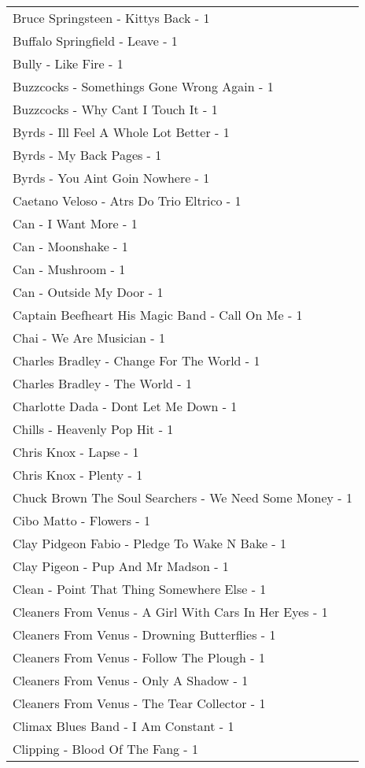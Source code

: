 \documentclass[
]{article}
\begin{document}
\begin{longtable}{l}
Bruce Springsteen - Kittys Back - 1 \\ 
Buffalo Springfield - Leave - 1 \\ 
Bully - Like Fire - 1 \\ 
Buzzcocks - Somethings Gone Wrong Again - 1 \\ 
Buzzcocks - Why Cant I Touch It - 1 \\ 
Byrds - Ill Feel A Whole Lot Better - 1 \\ 
Byrds - My Back Pages - 1 \\ 
Byrds - You Aint Goin Nowhere - 1 \\ 
Caetano Veloso - Atrs Do Trio Eltrico - 1 \\ 
Can - I Want More - 1 \\ 
Can - Moonshake - 1 \\ 
Can - Mushroom - 1 \\ 
Can - Outside My Door - 1 \\ 
Captain Beefheart His Magic Band - Call On Me - 1 \\ 
Chai - We Are Musician - 1 \\ 
Charles Bradley - Change For The World - 1 \\ 
Charles Bradley - The World - 1 \\ 
Charlotte Dada - Dont Let Me Down - 1 \\ 
Chills - Heavenly Pop Hit - 1 \\ 
Chris Knox - Lapse - 1 \\ 
Chris Knox - Plenty - 1 \\ 
Chuck Brown The Soul Searchers - We Need Some Money - 1 \\ 
Cibo Matto - Flowers - 1 \\ 
Clay Pidgeon Fabio - Pledge To Wake N Bake - 1 \\ 
Clay Pigeon - Pup And Mr Madson - 1 \\ 
Clean - Point That Thing Somewhere Else - 1 \\ 
Cleaners From Venus - A Girl With Cars In Her Eyes - 1 \\ 
Cleaners From Venus - Drowning Butterflies - 1 \\ 
Cleaners From Venus - Follow The Plough - 1 \\ 
Cleaners From Venus - Only A Shadow - 1 \\ 
Cleaners From Venus - The Tear Collector - 1 \\ 
Climax Blues Band - I Am Constant - 1 \\ 
Clipping - Blood Of The Fang - 1 \\ 

\end{longtable}
\end{document}
